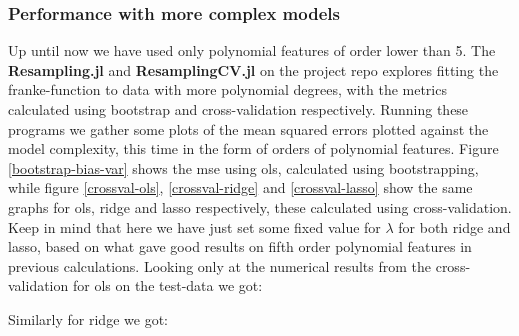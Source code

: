 \documentclass{article}
\begin{document}
\subsubsection{Performance with more complex models}
Up until now we have used only polynomial features of order lower than 5. The
\textbf{Resampling.jl} and \textbf{ResamplingCV.jl} on the project repo
\cite{githubrepoproject1} explores fitting the franke-function to data with more
polynomial degrees, with the metrics calculated using bootstrap and
cross-validation respectively. Running these programs we gather some plots of
the mean squared errors plotted against the model complexity, this time in the
form of orders of polynomial features. Figure \ref{bootstrap-bias-var} shows the
mse using ols, calculated using bootstrapping, while figure \ref{crossval-ols},
\ref{crossval-ridge} and \ref{crossval-lasso} show the same graphs for ols,
ridge and lasso respectively, these calculated using cross-validation. Keep in
mind that here we have just set some fixed value for $\lambda$ for both ridge
and lasso, based on what gave good results on fifth order polynomial features in
previous calculations. Looking only at the numerical results from the
cross-validation for ols on the test-data we got:

\begin{table}[htpb!]
\end{table}

Similarly for ridge we got:

\begin{table}[htpb!]
\end{table}
\end{document}
